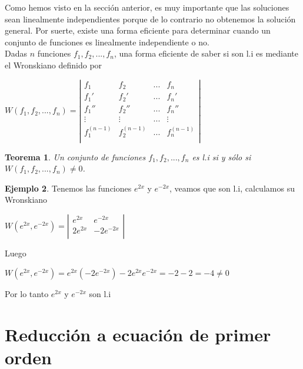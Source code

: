\documentclass{article}
\theoremstyle{plain}
\newtheorem{thm}{Teorema}[section]
\theoremstyle{definition}
\newtheorem{ejem}[thm]{Ejemplo}
\begin{document}
Como hemos visto en la sección anterior, es muy importante que las soluciones sean linealmente independientes porque de lo contrario no obtenemos la solución general. Por suerte, existe una forma eficiente para determinar cuando un conjunto de funciones es linealmente independiente o no.\\

Dadas $n$ funciones $f_1,f_2,... ,f_n$, una forma eficiente de saber si son  l.i es mediante el Wronskiano definido por


\begin{center}
$W(f_1,f_2, ... , f_n) = \left| \begin{matrix}
f_1 & f_2 & ... & f_n \\
f_1' & f_2' & ... & f_n' \\
f_1'' & f_2'' & ... & f_n'' \\
\vdots & \vdots & ... & \vdots \\
f_1^{(n-1)} & f_2^{(n-1)} & ... & f_n^{(n-1)} \\
\end{matrix} \right|$
\end{center}

\begin{thm}Un conjunto de funciones $f_1,f_2,... ,f_n$ es l.i si y sólo si $W(f_1,f_2,..., f_n) \neq 0$. \\
\end{thm}

\begin{ejem}Tenemos las funciones $e^{2x}$ y $e^{-2x}$, veamos que son l.i, calculamos su Wronskiano
\end{ejem}

\begin{center}
$W(e^{2x},e^{-2x}) = \left| \begin{matrix}
e^{2x} & e^{-2x} \\
2e^{2x} & -2e^{-2x} \\
\end{matrix} \right|$
\end{center}

Luego

\begin{center}
$W(e^{2x},e^{-2x}) =e^{2x}(-2e^{-2x}) -2e^{2x}e^{-2x} = -2-2 =-4 \neq 0$
\end{center}

Por lo tanto $e^{2x}$ y $e^{-2x}$ son l.i


\newpage

\section{Reducción a ecuación de primer orden}
\end{document}
